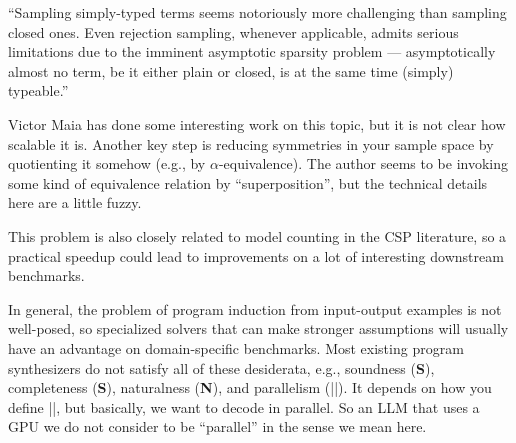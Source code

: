 \documentclass[sigplan,nonacm]{acmart}\settopmatter{printfolios=false,printccs=false,printacmref=false}
\begin{document}
  ``Sampling simply-typed terms seems notoriously more challenging than sampling closed ones. Even rejection sampling, whenever applicable, admits serious limitations due to the imminent asymptotic sparsity problem — asymptotically almost no term, be it either plain or closed, is at the same time (simply) typeable.''

  Victor Maia has done some interesting work on this topic, but it is not clear how scalable it is. Another key step is reducing symmetries in your sample space by quotienting it somehow (e.g., by $\alpha$-equivalence). The author seems to be invoking some kind of equivalence relation by ``superposition'', but the technical details here are a little fuzzy.

  This problem is also closely related to model counting in the CSP literature, so a practical speedup could lead to improvements on a lot of interesting downstream benchmarks.

  In general, the problem of program induction from input-output examples is not well-posed, so specialized solvers that can make stronger assumptions will usually have an advantage on domain-specific benchmarks. Most existing program synthesizers do not satisfy all of these desiderata, e.g., soundness (\textbf{S}), completeness (\textbf{S}), naturalness (\textbf{N}), and parallelism (||). It depends on how you define ||, but basically, we want to decode in parallel. So an LLM that uses a GPU we do not consider to be ``parallel'' in the sense we mean here.

  \newcommand{\tidyparse}{\href{https://arxiv.org/pdf/2408.01849}{Tidyparse}~\cite{considine2023pragmatic}}
  \newcommand{\seqtoparse}{\href{https://pg.ucsd.edu/publications/Seq2Parse-neurosymbolic-parse-error-repair_OOPSLA-2022.pdf}{Seq2Parse}~\cite{sakkas2022seq2parse}}
  \newcommand{\bifi}{\href{https://arxiv.org/pdf/2106.06600}{BIFI}~\cite{yasunaga2021break}}
  \newcommand{\ordinalfix}{\href{https://arxiv.org/pdf/2309.06771}{OrdinalFix}~\cite{zhang2023ordinalfix}}
  \newcommand{\ahopeterson}{\href{https://epubs.siam.org/doi/10.1137/0201022}{Aho/Peterson}~\cite{aho1972minimum}}
\end{document}
